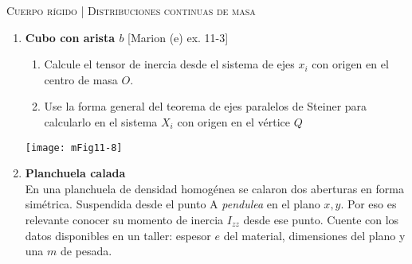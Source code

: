 \documentclass[11pt, spanish, a4paper, twoside]{article}
\begin{document}
\begin{center}
  \textsc{\large Cuerpo rígido | Distribuciones continuas de masa}
\end{center}


\begin{enumerate}
	\item 
	\begin{minipage}[t][4.5cm]{0.55\textwidth}
			\textbf{Cubo con arista \(b\)} [Marion (e) ex. 11-3]
			\begin{enumerate}
				\item Calcule el tensor de inercia desde el sistema de ejes \(x_i\) con origen en el centro de masa \(O\).
				\item Use la forma general del teorema de ejes paralelos de Steiner para calcularlo en el sistema \(X_i\) con origen en el vértice \(Q\) 
			\end{enumerate}
		\end{minipage}
		\begin{minipage}[c][1cm][t]{0.4\textwidth}
			\texttt{[image: mFig11-8]}
		\end{minipage}


	\item 
		\begin{minipage}[t][4cm]{0.49\textwidth}
			\textbf{Planchuela calada}\\
			En una planchuela de densidad homogénea se calaron dos aberturas en forma simétrica.
			Suspendida desde el punto A \emph{pendulea} en el plano \(x,y\).
			Por eso es relevante conocer su momento de inercia \(I_{zz}\) desde ese punto.
			Cuente con los datos disponibles en un taller: espesor $e$ del material, dimensiones del plano y una $m$ de pesada. 


\end{minipage}
\end{enumerate}
\end{document}
